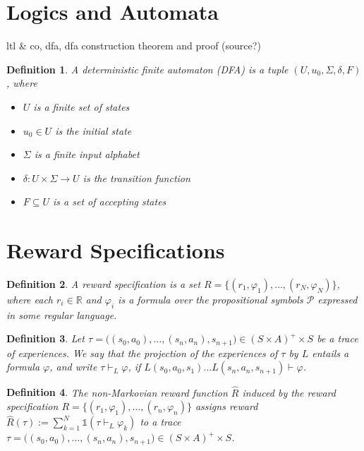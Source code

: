 \documentclass[12pt, a4paper]{article}
\theoremstyle{plain}
\newtheorem*{definition}{Definition}
\renewcommand{\phi}{\varphi}
\begin{document}
\section*{Logics and Automata}

ltl \& co, dfa, dfa construction theorem and proof (source?)

\begin{definition}
	A \emph{deterministic finite automaton (DFA)} is a tuple $(U, u_0, \Sigma, \delta, F)$, where
	\begin{itemize}
		\item $U$ is a finite set of states
		\item $u_0 \in U$ is the initial state
		\item $\Sigma$ is a finite input alphabet
		\item $\delta : U \times \Sigma \to U$ is the transition function
		\item $F \subseteq U$ is a set of accepting states
	\end{itemize}
\end{definition}

\section*{Reward Specifications}

\begin{definition}
	A \emph{reward specification} is a set $R = \{(r_1, \phi_1), \dots, (r_N, \phi_N)\}$, where each $r_i \in \mathbb{R}$ and $\phi_i$ is a formula over the propositional symbols $\mathcal{P}$ expressed in some regular language.
\end{definition}

\begin{definition}
	Let $\tau = \big( (s_0, a_0), \dots, (s_n, a_n), s_{n+1} \big)\in (S \times A)^+ \times S$ be a trace of experiences. We say that the projection of the experiences of $\tau$ by $L$ \emph{entails} a formula $\phi$, and write $\tau \vdash_L \phi$, if $L(s_0, a_0, s_1) \dots L(s_n, a_n, s_{n+1}) \vdash \phi$.
\end{definition}

\begin{definition}
	The non-Markovian reward function $\hat{R}$ \emph{induced by the reward specification} $R = \{(r_1, \phi_1), \dots, (r_n, \phi_n)\}$ assigns reward $\hat{R}(\tau) := \sum_{k=1}^N \mathds{1}(\tau \vdash_L \phi_k)$ to a trace $\tau = \big( (s_0, a_0), \dots, (s_n, a_n), s_{n+1} \big) \in (S \times A)^+ \times S$.
\end{definition}
\end{document}
